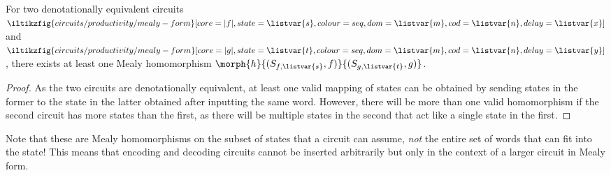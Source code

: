 \begin{lemma}\label{lem:bisimulation-initial-states}
    For two denotationally equivalent circuits \(
    \iltikzfig{circuits/productivity/mealy-form}[core=|f|,state=\listvar{s},colour=seq,dom=\listvar{m},cod=\listvar{n},delay=\listvar{x}]
    \) and \(
    \iltikzfig{circuits/productivity/mealy-form}[core=|g|,state=\listvar{t},colour=seq,dom=\listvar{m},cod=\listvar{n},delay=\listvar{y}]
    \), there exists at least one Mealy homomorphism \(
    \morph{h}{(S_{f,\listvar{s}},f)}{(S_{g,\listvar{t}},g)}
    \).
\end{lemma}
\begin{proof}
    As the two circuits are denotationally equivalent, at least one valid
    mapping of states can be obtained by sending states in the former to the
    state in the latter obtained after inputting the same word.
    However, there will be more than one valid homomorphism if the second
    circuit has more states than the first, as there will be multiple states in
    the second that act like a single state in the first.
\end{proof}

Note that these are Mealy homomorphisms on the subset of states that a circuit
can assume, \emph{not} the entire set of words that can fit into the state!
This means that encoding and decoding circuits cannot be inserted arbitrarily
but only in the context of a larger circuit in Mealy form.

